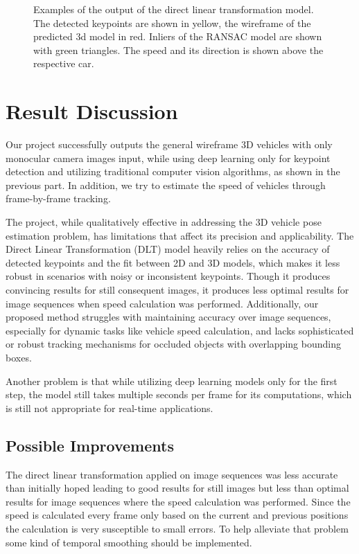 \documentclass[conference]{IEEEtran}
\begin{document}
\begin{figure}[htbp]
    \caption{Examples of the output of the direct linear transformation model. The detected keypoints are shown in yellow, the wireframe of the predicted 3d model in red. Inliers of the RANSAC model are shown with green triangles. The speed and its direction is shown above the respective car.}
    \label{img:exampleOutput}
\end{figure}

\section{Result Discussion}

Our project successfully outputs the general wireframe 3D vehicles with only monocular camera images input, while using deep learning only for keypoint detection and utilizing traditional computer vision algorithms, as shown in the previous part. In addition, we try to estimate the speed of vehicles through frame-by-frame tracking.

The project, while qualitatively effective in addressing the 3D vehicle pose estimation problem, has limitations that affect its precision and applicability. The Direct Linear Transformation (DLT) model heavily relies on the accuracy of detected keypoints and the fit between 2D and 3D models, which makes it less robust in scenarios with noisy or inconsistent keypoints. Though it produces convincing results for still consequent images, it produces less optimal results for image sequences when speed calculation was performed. Additionally, our proposed method struggles with maintaining accuracy over image sequences, especially for dynamic tasks like vehicle speed calculation, and lacks sophisticated or robust tracking mechanisms for occluded objects with overlapping bounding boxes. 

Another problem is that while utilizing deep learning models only for the first step, the model still takes multiple seconds per frame for its computations, which is still not appropriate for real-time applications.

\subsection{Possible Improvements}

The direct linear transformation applied on image sequences was less accurate than initially hoped leading to good results for still images but less than optimal results for image sequences where the speed calculation was performed. Since the speed is calculated every frame only based on the current and previous positions the calculation is very susceptible to small errors. To help alleviate that problem some kind of temporal smoothing should be implemented. 
\end{document}

